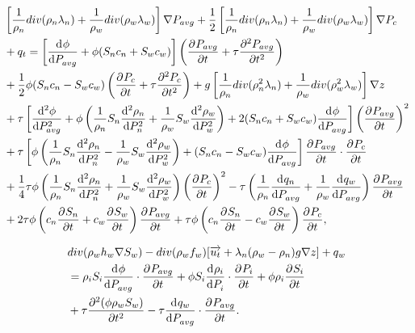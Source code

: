 \begin{equation} \label{eq:full_pressure}
 \begin{aligned}
  &\left[ \frac{1}{\rho_n} div (\rho_n\lambda_n) + \frac{1}{\rho_w} div (\rho_w\lambda_w) \right] \nabla P_{avg} + 
  \frac{1}{2} \left[ \frac{1}{\rho_n} div (\rho_n\lambda_n) + \frac{1}{\rho_w} div (\rho_w\lambda_w) \right] \nabla P_c \\
  & + q_t = \left[ \dd{\phi}{P_{avg}} + \phi (S_n c_n + S_w c_w) \right] \left( \pd{P_{avg}}{t} + \tau \pd[2]{P_{avg}}{t} \right) \\
  & + \frac{1}{2} \phi (S_n c_n - S_w c_w) \left( \pd{P_{c}}{t} + \tau \pd[2]{P_c}{t} \right)
  + g \left[ \frac{1}{\rho_n} div (\rho_n^2\lambda_n) + \frac{1}{\rho_w} div (\rho_w^2\lambda_w) \right] \nabla z \\
  & + \tau \left[ \dd[2]{\phi}{P_{avg}} + \phi \left( \frac{1}{\rho_n} S_n \dd[2]{\rho_n}{P_n} + \frac{1}{\rho_w} S_w \dd[2]{\rho_w}{P_w} \right)
  + 2(S_n c_n + S_w c_w) \dd{\phi}{P_{avg}} \right] {\left( \pd{P_{avg}}{t}\right) }^2 \\
  & + \tau \left[ \phi \left( \frac{1}{\rho_n} S_n \dd[2]{\rho_n}{P_n} - \frac{1}{\rho_w} S_w \dd[2]{\rho_w}{P_w} \right) 
  + (S_n c_n - S_w c_w) \dd{\phi}{P_{avg}} \right] \pd{P_{avg}}{t} \cdot \pd{P_c}{t} \\
  & + \frac{1}{4} \tau \phi \left( \frac{1}{\rho_n} S_n \dd[2]{\rho_n}{P_n} + \frac{1}{\rho_w} S_w \dd[2]{\rho_w}{P_w} \right) {\left( \pd{P_c}{t}\right) }^2 
  - \tau \left(\frac{1}{\rho_n}\dd{q_n}{P_{avg}} + \frac{1}{\rho_w}\dd{q_w}{P_{avg}}\right) \pd{P_{avg}}{t} \\
  & + 2 \tau \phi \left(c_n \pd{S_n}{t} + c_w \pd{S_w}{t} \right) \pd{P_{avg}}{t}+ \tau \phi \left(c_n \pd{S_n}{t} - c_w \pd{S_w}{t} \right) \pd{P_c}{t},
 \end{aligned}
\end{equation}

\begin{equation} \label{eq:full_saturation}
 \begin{aligned}
  &div(\rho_w h_w \nabla S_w) - div(\rho_w f_w)[\overrightarrow{u_t} + \lambda_n(\rho_w - \rho_n)g \nabla z] + q_w \\
  & = \rho_i S_i \dd{\phi}{P_{avg}} \cdot \pd{P_{avg}}{t}
 + \phi S_i \dd{\rho_i}{P_i} \cdot \pd{P_i}{t} + \phi \rho_i \pd{S_i}{t} \\
  & + \tau \pd[2]{(\phi \rho_w S_w)}{t} - \tau \dd{q_w}{P_{avg}} \cdot \pd{P_{avg}}{t}.
 \end{aligned}
\end{equation} 

